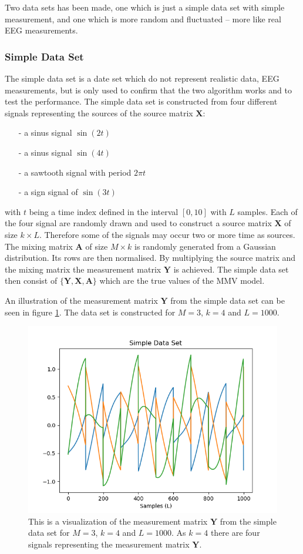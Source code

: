 Two data sets has been made, one which is just a simple data set with simple measurement, and one which is more random and fluctuated -- more like real EEG measurements.

\subsubsection{Simple Data Set}
The simple data set is a date set which do not represent realistic data, EEG measurements, but is only used to confirm that the two algorithm works and to test the performance.
The simple data set is constructed from four different signals representing the sources of the source matrix $\mathbf{X}$: 
\begin{itemize}
\item[-] a sinus signal $\sin(2t)$
\item[-] a sinus signal $\sin(4t)$
\item[-] a sawtooth signal with period $2 \pi t$
\item[-] a sign signal of $\sin(3t)$
\end{itemize}
with $t$ being a time index defined in the interval $[0,10]$ with $L$ samples. Each of the four signal are randomly drawn and used to construct a source matrix $\mathbf{X}$ of size $k \times L$. Therefore some of the signals may occur two or more time as sources.
The mixing matrix $\mathbf{A}$ of size $M \times k$ is randomly generated from a Gaussian distribution. Its rows are then normalised. 
By multiplying the source matrix and the mixing matrix the measurement matrix $\mathbf{Y}$ is achieved.
The simple data set then consist of $\{ \mathbf{Y}, \mathbf{X}, \mathbf{A} \}$ which are the true values of the MMV model.

An illustration of the measurement matrix $\mathbf{Y}$ from the simple data set can be seen in figure \ref{fig:mix}. The data set is constructed for $M = 3$, $k = 4$ and $L = 1000$.
\begin{figure}[H]
\centering
\includegraphics[scale=0.5]{figures/chapter6/Mix_Data_m3_n4_k4_L1000.png}
\caption{This is a visualization of the measurement matrix $\mathbf{Y}$ from the simple data set for $M = 3$, $k=4$ and $L=1000$. As $k = 4$ there are four signals representing the measurement matrix $\mathbf{Y}$.}
\label{fig:mix}
\end{figure}
\noindent

